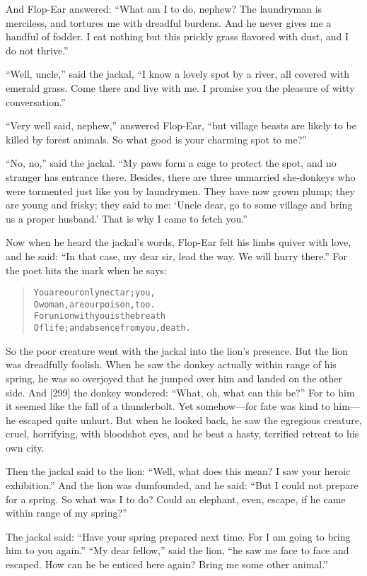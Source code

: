 \documentclass[article, twoside, 14pt]{memoir}
\renewenvironment{verbatim}{%
\begin{quote}%
\vskip -10pt%
\begin{alltt}\normalfont\large}{\end{alltt}%
\end{quote}%
\vskip -10pt
} %
\begin{document}
And Flop-Ear answered:
``What am I to do, nephew? The laundryman is merciless, and tortures me with dreadful burdens. And he never gives me a handful of fodder. I eat nothing but this prickly grass flavored with dust, and I do not thrive.''

``Well, uncle,'' said the jackal,
``I know a lovely spot by a river, all covered with emerald grass. Come there and live with me. I promise you the pleasure of witty conversation.''

``Very well said, nephew,'' answered Flop-Ear,
``but village beasts are likely to be killed by forest animals. So what good is your charming spot to me?''

``No, no,'' said the jackal.
``My paws form a cage to protect the spot, and no stranger has entrance there. Besides, there are three unmarried she-donkeys who were tormented just like you by laundrymen. They have now grown plump; they are young and frisky; they said to me: `Uncle dear, go to some village and bring us a proper husband.' That is why I came to fetch you.''

Now when he heard the jackal's words, Flop-Ear felt his limbs
quiver with love, and he said:
``In that case, my dear sir, lead the way. We will hurry there.''
For the poet hits the mark when he says:

\begin{verbatim}
You are our only nectar; you,
O woman, are our poison, too.
For union with you is the breath
Of life; and absence from you, death.
\end{verbatim}
So the poor creature went with the jackal into the lion's presence.
But the lion was dreadfully foolish. When he saw the donkey
actually within range of his spring, he was so overjoyed that he
jumped over him and landed on the other side. And [299] the donkey
wondered: ``What, oh, what can this be?'' For to him it seemed like
the fall of a thunderbolt. Yet somehow---for fate was kind to
him---he escaped quite unhurt. But when he looked back, he saw the
egregious creature, cruel, horrifying, with bloodshot eyes, and he
beat a hasty, terrified retreat to his own city.

Then the jackal said to the lion:
``Well, what does this mean? I saw your heroic exhibition.'' And
the lion was dumfounded, and he said:
``But I could not prepare for a spring. So what was I to do? Could an elephant, even, escape, if he came within range of my spring?''

The jackal said:
``Have your spring prepared next time. For I am going to bring him to you again.''
``My dear fellow,'' said the lion,
``he saw me face to face and escaped. How can he be enticed here again? Bring me some other animal.''
\end{document}
